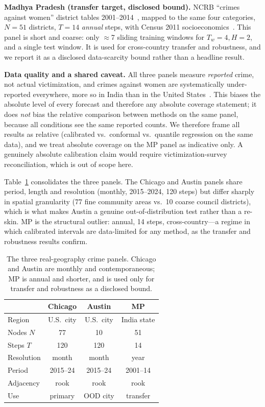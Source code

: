 \documentclass[11pt,conference]{IEEEtran}
\begin{document}
\textbf{Madhya Pradesh (transfer target, disclosed bound).} NCRB ``crimes
against women'' district tables 2001--2014~\cite{ncrb_cii}, mapped to the same
four categories, $N{=}51$ districts, $T{=}14$ \emph{annual} steps, with Census
2011 socioeconomics~\cite{census2011}. This panel is short and coarse: only
$\approx$7 sliding training windows for $T_w{=}4,H{=}2$, and a single test
window. It is used for cross-country transfer and robustness, and we report it as
a disclosed data-scarcity bound rather than a headline result.

\textbf{Data quality and a shared caveat.} All three panels measure
\emph{reported} crime, not actual victimization, and crimes against women are
systematically under-reported everywhere, more so in India than in the United
States~\cite{ncrb_cii,census2011}. This biases the absolute level of every
forecast and therefore any absolute coverage statement; it does \emph{not} bias
the relative comparison between methods on the same panel, because all
conditions see the same reported counts. We therefore frame all results as
relative (calibrated vs.\ conformal vs.\ quantile regression on the same data),
and we treat absolute coverage on the MP panel as indicative only. A genuinely
absolute calibration claim would require victimization-survey reconciliation,
which is out of scope here.

Table~\ref{tab:panels} consolidates the three panels. The Chicago and Austin
panels share period, length and resolution (monthly, 2015--2024, 120 steps) but
differ sharply in spatial granularity (77 fine community areas vs.\ 10 coarse
council districts), which is what makes Austin a genuine out-of-distribution
test rather than a re-skin. MP is the structural outlier: annual, 14 steps,
cross-country---a regime in which calibrated intervals are data-limited for any
method, as the transfer and robustness results confirm.

\begin{table}[t]
\centering
\caption{The three real-geography crime panels. Chicago and Austin are monthly
and contemporaneous; MP is annual and shorter, and is used only for transfer and
robustness as a disclosed bound.}
\label{tab:panels}
\footnotesize
\setlength{\tabcolsep}{4pt}
\begin{tabular}{lccc}
\toprule
 & Chicago & Austin & MP\\
\midrule
Region & U.S.\ city & U.S.\ city & India state\\
Nodes $N$ & 77 & 10 & 51\\
Steps $T$ & 120 & 120 & 14\\
Resolution & month & month & year\\
Period & 2015--24 & 2015--24 & 2001--14\\
Adjacency & rook & rook & rook\\
Use & primary & OOD city & transfer\\
\bottomrule
\end{tabular}
\end{table}
\end{document}
